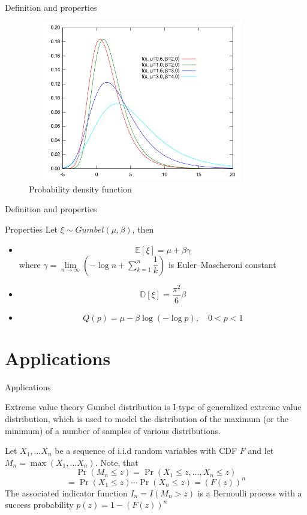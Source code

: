 \documentclass{beamer}
\begin{document}
\begin{frame}{Definition and properties}
        \begin{figure}[h]
\caption{Probability density function}
\centering
\includegraphics[width=10cm, height=7cm]{Gumbel-Density.png}
\end{figure}
\end{frame}


\begin{frame}{Definition and properties}
    \begin{block}{Properties}
        Let $\xi \sim Gumbel(\mu, \beta)$, then
        \begin{itemize}
            \item \[\mathbb{E}[\xi] = \mu + \beta\gamma\]
            where $\gamma = \lim\limits_{n\to\infty}\left(-\log n + \sum_{k=1}^n\dfrac{1}{k}\right)$ is  Euler–Mascheroni constant
            \item \[\mathbb{D}[\xi] = \dfrac{\pi^2}{6}\beta\]
            \item \[Q(p) = \mu - \beta\log(-\log p ), \quad 0 < p < 1\]
        \end{itemize}
    \end{block}
\end{frame}

\section{Applications}
\begin{frame}{Applications}
    \begin{block}{Extreme value theory}
        Gumbel distribution is I-type of generalized extreme value distribution, which is used to model the distribution of the maximum (or the minimum) of a number of samples of various distributions. 

        Let $X_1, \ldots X_n$ be a sequence of i.i.d random variables with CDF $F$ and let $M_n = \max{(X_1, \ldots X_n)}$. Note, that
        \[\Pr(M_n \leq z)  = \Pr(X_1 \leq z, \dots, X_n \leq z)\]
        \[ = \Pr(X_1 \leq z) \cdots \Pr(X_n \leq z) = (F(z))^n\]
        The associated indicator function $I_n = I(M_n > z)$ is a Bernoulli process with a success probability $p(z) = 1 - (F(z))^n$
    \end{block}
\end{frame}
\end{document}
